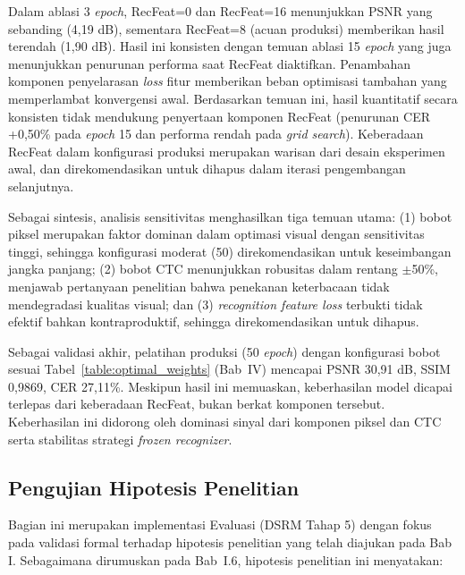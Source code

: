 \begin{enumerate}[leftmargin=1.5em, labelsep=0.5em, itemindent=0pt, label=\arabic*., topsep=0pt, partopsep=0pt]
\begin{enumerate}[leftmargin=1.5em, labelsep=0.5em, itemindent=0pt, topsep=0.5em, label=\alph*.]
        Dalam ablasi 3 \textit{epoch}, RecFeat=0 dan RecFeat=16 menunjukkan PSNR yang sebanding (4,19 dB), sementara RecFeat=8 (acuan produksi) memberikan hasil terendah (1,90 dB). Hasil ini konsisten dengan temuan ablasi 15 \textit{epoch} yang juga menunjukkan penurunan performa saat RecFeat diaktifkan. Penambahan komponen penyelarasan \textit{loss} fitur memberikan beban optimisasi tambahan yang memperlambat konvergensi awal. Berdasarkan temuan ini, hasil kuantitatif secara konsisten tidak mendukung penyertaan komponen RecFeat (penurunan CER +0,50\% pada \textit{epoch} 15 dan performa rendah pada \textit{grid search}). Keberadaan RecFeat dalam konfigurasi produksi merupakan warisan dari desain eksperimen awal, dan direkomendasikan untuk dihapus dalam iterasi pengembangan selanjutnya.
    \end{enumerate}
\end{enumerate}

Sebagai sintesis, analisis sensitivitas menghasilkan tiga temuan utama: (1) bobot piksel merupakan faktor dominan dalam optimasi visual dengan sensitivitas tinggi, sehingga konfigurasi moderat (50) direkomendasikan untuk keseimbangan jangka panjang; (2) bobot CTC menunjukkan robusitas dalam rentang $\pm$50\%, menjawab pertanyaan penelitian bahwa penekanan keterbacaan tidak mendegradasi kualitas visual; dan (3) \textit{recognition feature loss} terbukti tidak efektif bahkan kontraproduktif, sehingga direkomendasikan untuk dihapus.

Sebagai validasi akhir, pelatihan produksi (50 \textit{epoch}) dengan konfigurasi bobot sesuai Tabel~\ref{table:optimal_weights} (Bab~IV) mencapai PSNR 30,91 dB, SSIM 0,9869, CER 27,11\%. Meskipun hasil ini memuaskan, keberhasilan model dicapai terlepas dari keberadaan RecFeat, bukan berkat komponen tersebut. Keberhasilan ini didorong oleh dominasi sinyal dari komponen piksel dan CTC serta stabilitas strategi \textit{frozen recognizer}.



\subsection{Pengujian Hipotesis Penelitian}
\label{subsec:pengujian-hipotesis}

Bagian ini merupakan implementasi Evaluasi (DSRM Tahap 5) dengan fokus pada validasi formal terhadap hipotesis penelitian yang telah diajukan pada Bab I. Sebagaimana dirumuskan pada Bab~I.6, hipotesis penelitian ini menyatakan:

